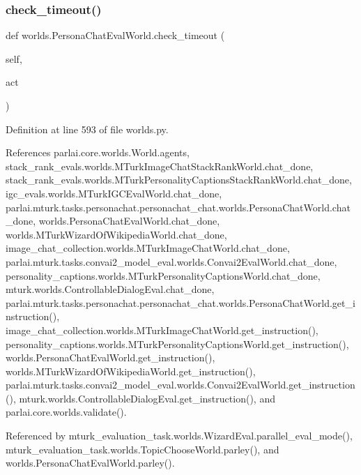 \subsubsection{\texorpdfstring{check\+\_\+timeout()}{check\_timeout()}}
{\footnotesize\ttfamily def worlds.\+Persona\+Chat\+Eval\+World.\+check\+\_\+timeout (\begin{DoxyParamCaption}\item[{}]{self,  }\item[{}]{act }\end{DoxyParamCaption})}



Definition at line 593 of file worlds.\+py.



References parlai.\+core.\+worlds.\+World.\+agents, stack\+\_\+rank\+\_\+evals.\+worlds.\+M\+Turk\+Image\+Chat\+Stack\+Rank\+World.\+chat\+\_\+done, stack\+\_\+rank\+\_\+evals.\+worlds.\+M\+Turk\+Personality\+Captions\+Stack\+Rank\+World.\+chat\+\_\+done, igc\+\_\+evals.\+worlds.\+M\+Turk\+I\+G\+C\+Eval\+World.\+chat\+\_\+done, parlai.\+mturk.\+tasks.\+personachat.\+personachat\+\_\+chat.\+worlds.\+Persona\+Chat\+World.\+chat\+\_\+done, worlds.\+Persona\+Chat\+Eval\+World.\+chat\+\_\+done, worlds.\+M\+Turk\+Wizard\+Of\+Wikipedia\+World.\+chat\+\_\+done, image\+\_\+chat\+\_\+collection.\+worlds.\+M\+Turk\+Image\+Chat\+World.\+chat\+\_\+done, parlai.\+mturk.\+tasks.\+convai2\+\_\+model\+\_\+eval.\+worlds.\+Convai2\+Eval\+World.\+chat\+\_\+done, personality\+\_\+captions.\+worlds.\+M\+Turk\+Personality\+Captions\+World.\+chat\+\_\+done, mturk.\+worlds.\+Controllable\+Dialog\+Eval.\+chat\+\_\+done, parlai.\+mturk.\+tasks.\+personachat.\+personachat\+\_\+chat.\+worlds.\+Persona\+Chat\+World.\+get\+\_\+instruction(), image\+\_\+chat\+\_\+collection.\+worlds.\+M\+Turk\+Image\+Chat\+World.\+get\+\_\+instruction(), personality\+\_\+captions.\+worlds.\+M\+Turk\+Personality\+Captions\+World.\+get\+\_\+instruction(), worlds.\+Persona\+Chat\+Eval\+World.\+get\+\_\+instruction(), worlds.\+M\+Turk\+Wizard\+Of\+Wikipedia\+World.\+get\+\_\+instruction(), parlai.\+mturk.\+tasks.\+convai2\+\_\+model\+\_\+eval.\+worlds.\+Convai2\+Eval\+World.\+get\+\_\+instruction(), mturk.\+worlds.\+Controllable\+Dialog\+Eval.\+get\+\_\+instruction(), and parlai.\+core.\+worlds.\+validate().



Referenced by mturk\+\_\+evaluation\+\_\+task.\+worlds.\+Wizard\+Eval.\+parallel\+\_\+eval\+\_\+mode(), mturk\+\_\+evaluation\+\_\+task.\+worlds.\+Topic\+Choose\+World.\+parley(), and worlds.\+Persona\+Chat\+Eval\+World.\+parley().

